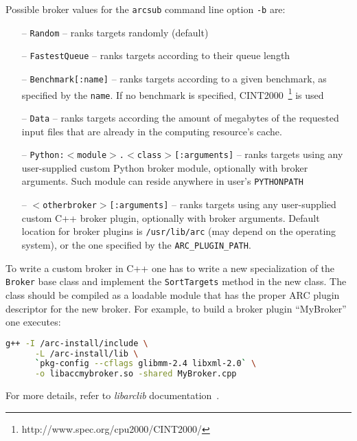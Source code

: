 
Possible broker values for the \texttt{arcsub} command line option \verb#-b# are:
\begin{itemize}
 \item[--] \texttt{Random} -- ranks targets randomly (default)
 \item[--] \texttt{FastestQueue} -- ranks targets according to their queue length
 \item[--] \texttt{Benchmark[:name]} -- ranks targets according to a given benchmark, as specified by the \texttt{name}. If no benchmark is specified, CINT2000~\footnote{http://www.spec.org/cpu2000/CINT2000/} is used
 \item[--] \texttt{Data} -- ranks targets according the amount of megabytes of the
requested input files that are already in the computing resource’s cache.
 \item[--] \texttt{Python:$<$module$>$.$<$class$>$[:arguments]} -- ranks targets using any user-supplied custom Python broker module, optionally with broker arguments. Such module can reside anywhere in user's \texttt{PYTHONPATH}
 \item[--] \texttt{$<$otherbroker$>$[:arguments]} -- ranks targets using any user-supplied custom C++ broker plugin, optionally with broker arguments. Default location for broker plugins is \texttt{/usr/lib/arc} (may depend on the operating system), or the one specified by the \texttt{ARC\_PLUGIN\_PATH}.
\end{itemize}

To write a custom broker in C++ one has to write a new specialization of the \texttt{Broker} base class and implement the \texttt{SortTargets} method in the new class. The class should be compiled as a loadable
module that has the proper ARC plugin descriptor for the new broker. For example, to build a broker plugin ``MyBroker'' one executes:
\begin{lstlisting}[language=sh]
  g++ -I /arc-install/include \
      -L /arc-install/lib \
      `pkg-config --cflags glibmm-2.4 libxml-2.0` \
      -o libaccmybroker.so -shared MyBroker.cpp
\end{lstlisting}
For more details, refer to \textit{libarclib} documentation~\cite{libarcclient}.

